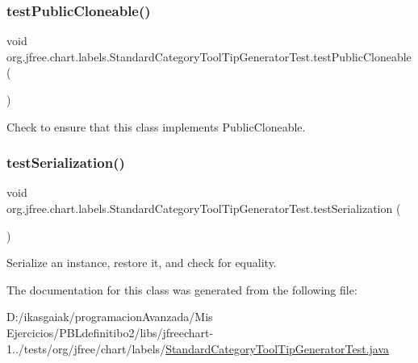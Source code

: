 \subsubsection{\texorpdfstring{test\+Public\+Cloneable()}{testPublicCloneable()}}
{\footnotesize\ttfamily void org.\+jfree.\+chart.\+labels.\+Standard\+Category\+Tool\+Tip\+Generator\+Test.\+test\+Public\+Cloneable (\begin{DoxyParamCaption}{ }\end{DoxyParamCaption})}

Check to ensure that this class implements Public\+Cloneable. \mbox{\label{classorg_1_1jfree_1_1chart_1_1labels_1_1_standard_category_tool_tip_generator_test_a7fc74bd6716bcea2039dc336d3813f29}} 
\subsubsection{\texorpdfstring{test\+Serialization()}{testSerialization()}}
{\footnotesize\ttfamily void org.\+jfree.\+chart.\+labels.\+Standard\+Category\+Tool\+Tip\+Generator\+Test.\+test\+Serialization (\begin{DoxyParamCaption}{ }\end{DoxyParamCaption})}

Serialize an instance, restore it, and check for equality. 

The documentation for this class was generated from the following file\+:\begin{DoxyCompactItemize}
\item 
D\+:/ikasgaiak/programacion\+Avanzada/\+Mis Ejercicios/\+P\+B\+Ldefinitibo2/libs/jfreechart-\/1../tests/org/jfree/chart/labels/\mbox{\hyperlink{_standard_category_tool_tip_generator_test_8java}{Standard\+Category\+Tool\+Tip\+Generator\+Test.\+java}}\end{DoxyCompactItemize}
